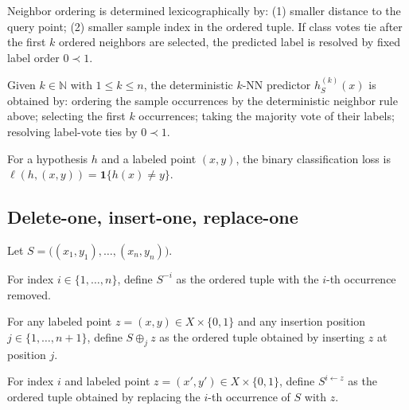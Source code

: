 \begin{definition}
Neighbor ordering is determined lexicographically by: (1) smaller distance to
the query point; (2) smaller sample index in the ordered tuple.  If class votes
tie after the first $k$ ordered neighbors are selected, the predicted label is
resolved by fixed label order $0 \prec 1$.
\end{definition}

\begin{definition}[$k$-NN Prediction]
\label{def:knn-prediction}
Given $k \in \mathbb{N}$ with $1 \le k \le n$, the deterministic $k$-NN
predictor $h_S^{(k)}(x)$ is obtained by: ordering the sample occurrences by the
deterministic neighbor rule above; selecting the first $k$ occurrences; taking
the majority vote of their labels; resolving label-vote ties by $0 \prec 1$.
\end{definition}

\begin{definition}
For a hypothesis $h$ and a labeled point $(x, y)$, the binary classification
loss is $\ell(h, (x, y)) = \mathbf{1}\{h(x) \ne y\}$.
\end{definition}

\subsection{Delete-one, insert-one, replace-one}

Let $S = \big((x_1, y_1), \ldots, (x_n, y_n)\big)$.

\begin{definition}
For index $i \in \{1,\ldots,n\}$, define $S^{-i}$ as the ordered tuple with the
$i$-th occurrence removed.
\end{definition}

\begin{definition}
For any labeled point $z = (x, y) \in X \times \{0,1\}$ and any insertion
position $j \in \{1,\ldots,n+1\}$, define $S \oplus_j z$ as the ordered tuple
obtained by inserting $z$ at position $j$.
\end{definition}

\begin{definition}
For index $i$ and labeled point $z = (x', y') \in X \times \{0,1\}$, define
$S^{i \leftarrow z}$ as the ordered tuple obtained by replacing the $i$-th
occurrence of $S$ with $z$.
\end{definition}

